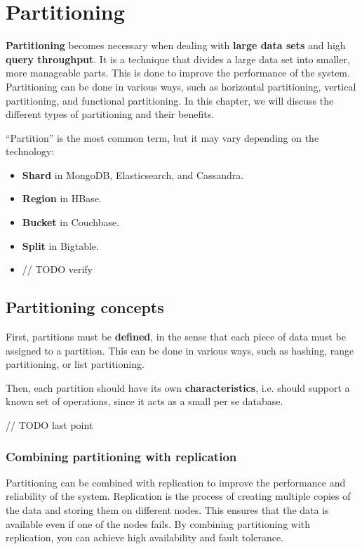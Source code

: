 \chapter{Partitioning}

\textbf{Partitioning} becomes necessary when dealing with \textbf{large data sets} and high \textbf{query throughput}. It is a technique that divides a large data set into smaller, more manageable parts. This is done to improve the performance of the system. Partitioning can be done in various ways, such as horizontal partitioning, vertical partitioning, and functional partitioning. In this chapter, we will discuss the different types of partitioning and their benefits.

``Partition'' is the most common term, but it may vary depending on the technology:
\begin{itemize}
   \item \textbf{Shard} in MongoDB, Elasticsearch, and Cassandra.
   \item \textbf{Region} in HBase.
   \item \textbf{Bucket} in Couchbase.
   \item \textbf{Split} in Bigtable.
   \item // TODO verify	
\end{itemize} 

\section{Partitioning concepts}
First, partitions must be \textbf{defined}, in the sense that each piece of data must be assigned to a partition. This can be done in various ways, such as hashing, range partitioning, or list partitioning.

Then, each partition should have its own \textbf{characteristics}, i.e. should support a known set of operations, since it acts as a small per se database.

// TODO last point

\subsection{Combining partitioning with replication}
Partitioning can be combined with replication to improve the performance and reliability of the system. Replication is the process of creating multiple copies of the data and storing them on different nodes. This ensures that the data is available even if one of the nodes fails. By combining partitioning with replication, you can achieve high availability and fault tolerance.

